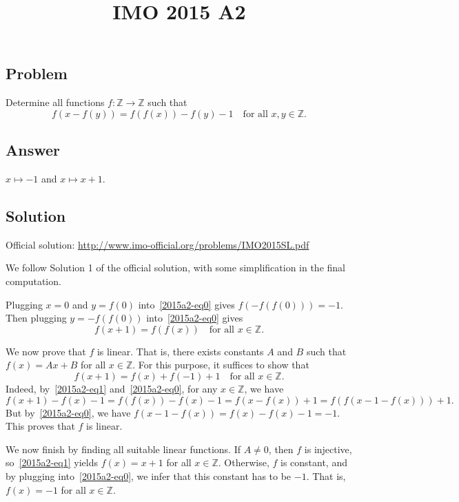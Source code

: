 \documentclass{article}
\title{IMO 2015 A2}
\author{}
\date{}
\newcommand{\Z}{\mathbb{Z}}
\begin{document}
\maketitle



\subsection*{Problem}

Determine all functions $f : \Z \to \Z$ such that
\[ f(x - f(y)) = f(f(x)) - f(y) - 1 \quad \text{for all } x, y \in \Z. \tag{*}\label{2015a2-eq0} \]



\subsection*{Answer}

$x \mapsto -1$ and $x \mapsto x + 1$.



\subsection*{Solution}

Official solution: \url{http://www.imo-official.org/problems/IMO2015SL.pdf}

We follow Solution 1 of the official solution, with some simplification in the final computation.

Plugging $x = 0$ and $y = f(0)$ into~\eqref{2015a2-eq0} gives $f(-f(f(0))) = -1$.
Then plugging $y = -f(f(0))$ into~\eqref{2015a2-eq0} gives
\[ f(x + 1) = f(f(x)) \quad \text{for all } x \in \Z. \tag{1}\label{2015a2-eq1} \]

We now prove that $f$ is linear.
That is, there exists constants $A$ and $B$ such that $f(x) = Ax + B$ for all $x \in \Z$.
For this purpose, it suffices to show that
\[ f(x + 1) = f(x) + f(-1) + 1 \quad \text{for all } x \in \Z. \]
Indeed, by~\eqref{2015a2-eq1} and~\eqref{2015a2-eq0}, for any $x \in \Z$, we have
\[ f(x + 1) - f(x) - 1 = f(f(x)) - f(x) - 1 = f(x - f(x)) + 1 = f(f(x - 1 - f(x))) + 1. \]
But by~\eqref{2015a2-eq0}, we have $f(x - 1 - f(x)) = f(x) - f(x) - 1 = -1$.
This proves that $f$ is linear.

We now finish by finding all suitable linear functions.
If $A \neq 0$, then $f$ is injective, so~\eqref{2015a2-eq1} yields $f(x) = x + 1$ for all $x \in \Z$.
Otherwise, $f$ is constant, and by plugging into~\eqref{2015a2-eq0}, we infer that this constant has to be $-1$.
That is, $f(x) = -1$ for all $x \in \Z$.
\end{document}

